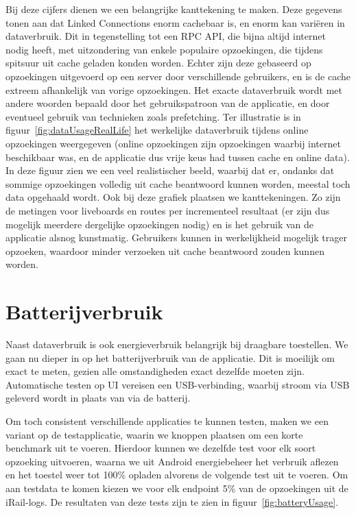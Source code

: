 Bij deze cijfers dienen we een belangrijke kanttekening te maken. Deze gegevens tonen aan dat Linked Connections enorm cachebaar is, en enorm kan variëren in dataverbruik. Dit in tegenstelling tot een RPC API, die bijna altijd internet nodig heeft, met uitzondering van enkele populaire opzoekingen, die tijdens spitsuur uit cache geladen konden worden. Echter zijn deze gebaseerd op opzoekingen uitgevoerd op een server door verschillende gebruikers, en is de cache extreem afhankelijk van vorige opzoekingen. Het exacte dataverbruik wordt met andere woorden bepaald door het gebruikspatroon van de applicatie, en door eventueel gebruik van technieken zoals prefetching. Ter illustratie is in figuur~\ref{fig:dataUsageRealLife} het werkelijke dataverbruik tijdens online opzoekingen weergegeven (online opzoekingen zijn opzoekingen waarbij internet beschikbaar was, en de applicatie dus vrije keus had tussen cache en online data). In deze figuur zien we een veel realistischer beeld, waarbij dat er, ondanks dat sommige opzoekingen volledig uit cache beantwoord kunnen worden, meestal toch data opgehaald wordt. Ook bij deze grafiek plaatsen we kanttekeningen. Zo zijn de metingen voor liveboards en routes per incrementeel resultaat (er zijn dus mogelijk meerdere dergelijke opzoekingen nodig) en is het gebruik van de applicatie alsnog kunstmatig. Gebruikers kunnen in werkelijkheid mogelijk trager opzoeken, waardoor minder verzoeken uit cache beantwoord zouden kunnen worden.


\section{Batterijverbruik}
Naast dataverbruik is ook energieverbruik belangrijk bij draagbare toestellen. We gaan nu dieper in op het batterijverbruik van de applicatie. Dit is moeilijk om exact te meten, gezien alle omstandigheden exact dezelfde moeten zijn. Automatische testen op UI vereisen een USB-verbinding, waarbij stroom via USB geleverd wordt in plaats van via de batterij. 

Om toch consistent verschillende applicaties te kunnen testen, maken we een variant op de testapplicatie, waarin we knoppen plaatsen om een korte benchmark uit te voeren. Hierdoor kunnen we dezelfde test voor elk soort opzoeking uitvoeren, waarna we uit Android energiebeheer het verbruik aflezen en het toestel weer tot 100\% opladen alvorens de volgende test uit te voeren. Om aan testdata te komen kiezen we voor elk endpoint 5\% van de opzoekingen uit de iRail-logs. De resultaten van deze tests zijn te zien in figuur~\ref{fig:batteryUsage}.

